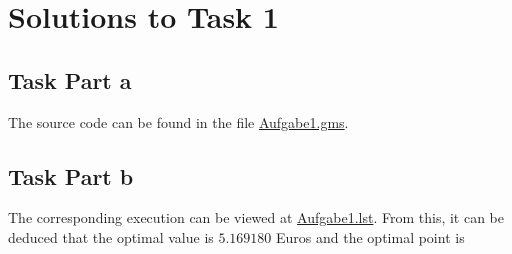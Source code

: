 \documentclass[a4paper,12pt]{article}
\begin{document}
\newpage

\section*{Solutions to Task 1}

\subsection*{Task Part a}

The source code can be found in the file \href{../src/r1/Aufgabe1.gms}{Aufgabe1.gms}.

\subsection*{Task Part b}

The corresponding execution can be viewed at \href{../results/r1/Aufgabe1.lst}{Aufgabe1.lst}. From this, it can be deduced that the optimal value is $5.169180$ Euros and the optimal point is
\end{document}
